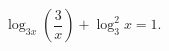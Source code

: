 \begin{ex}[type=equation]
	\begin{condition}
		$\log_{3x} \left(\dfrac{3}{x}\right) + \log_3^2 x  = 1.$
	\end{condition}
\end{ex}